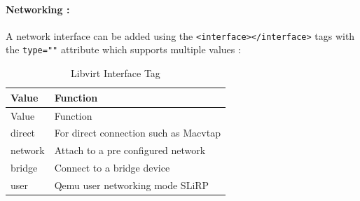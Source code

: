 \documentclass[
  14pt,
  english,
  a4paper,
]{scrreprt}
\begin{document}
\hypertarget{networking}{%
\paragraph*{Networking :}\label{networking}}

A network interface can be added using the
\texttt{\textless{}interface\textgreater{}\textless{}/interface\textgreater{}}
tags with the \texttt{type=""} attribute which supports multiple values
:

\hypertarget{tbl:lvirt_if_tag}{}
\begin{longtable}[]{@{}ll@{}}
\caption{\label{tbl:lvirt_if_tag}Libvirt Interface Tag}\tabularnewline
\toprule
\begin{minipage}[b]{0.13\columnwidth}\raggedright
Value\strut
\end{minipage} & \begin{minipage}[b]{0.52\columnwidth}\raggedright
Function\strut
\end{minipage}\tabularnewline
\midrule
\endfirsthead
\toprule
\begin{minipage}[b]{0.13\columnwidth}\raggedright
Value\strut
\end{minipage} & \begin{minipage}[b]{0.52\columnwidth}\raggedright
Function\strut
\end{minipage}\tabularnewline
\midrule
\endhead
\begin{minipage}[t]{0.13\columnwidth}\raggedright
direct\strut
\end{minipage} & \begin{minipage}[t]{0.52\columnwidth}\raggedright
For direct connection such as Macvtap\strut
\end{minipage}\tabularnewline
\begin{minipage}[t]{0.13\columnwidth}\raggedright
network\strut
\end{minipage} & \begin{minipage}[t]{0.52\columnwidth}\raggedright
Attach to a pre configured network\strut
\end{minipage}\tabularnewline
\begin{minipage}[t]{0.13\columnwidth}\raggedright
bridge\strut
\end{minipage} & \begin{minipage}[t]{0.52\columnwidth}\raggedright
Connect to a bridge device\strut
\end{minipage}\tabularnewline
\begin{minipage}[t]{0.13\columnwidth}\raggedright
user\strut
\end{minipage} & \begin{minipage}[t]{0.52\columnwidth}\raggedright
Qemu user networking mode SLiRP\strut
\end{minipage}\tabularnewline
\bottomrule
\end{longtable}
\end{document}
